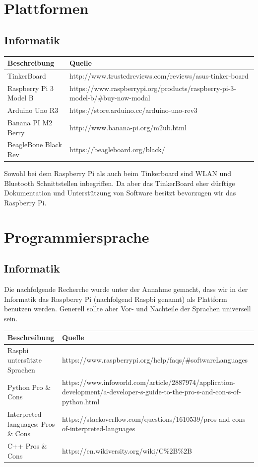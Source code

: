 \documentclass[a4paper]{report}
\begin{document}
\section{Plattformen}

\subsection{Informatik}
\vspace{1em}
\noindent
\begin{tabular}{|p{}|p{}|}
	\hline 
	\textbf{Beschreibung} & \textbf{Quelle} \\
	\hline
	TinkerBoard & http://www.trustedreviews.com/reviews/asus-tinker-board \\
	\hline
	Raspberry Pi 3 Model B & https://www.raspberrypi.org/products/raspberry-pi-3-model-b/\#buy-now-modal \\
	\hline
	Arduino Uno R3 & https://store.arduino.cc/arduino-uno-rev3\\
	\hline
	Banana PI M2 Berry & http://www.banana-pi.org/m2ub.html \\
	\hline
	BeagleBone Black Rev & https://beagleboard.org/black/\\
	\hline
\end{tabular}

\vspace{1em}
Sowohl bei dem Raspberry Pi als auch beim Tinkerboard sind WLAN und Bluetooth Schnittstellen inbegriffen. Da aber das TinkerBoard eher dürftige Dokumentation und Unterstützung von Software besitzt \parencite[Fazit]{Finnamore2017} bevorzugen wir das Raspberry Pi.

\section{Programmiersprache}


\subsection{Informatik}
Die nachfolgende Recherche wurde unter der Annahme gemacht, dass wir in der Informatik das Raspberry Pi (nachfolgend Raspbi genannt) als Plattform benutzen werden. Generell sollte aber Vor- und Nachteile der Sprachen universell sein.

\vspace{1em}
\noindent
\begin{tabular}{|p{}|p{}|}
	\hline 
	\textbf{Beschreibung} & \textbf{Quelle} \\
	\hline
	Raspbi untersützte Sprachen& https://www.raspberrypi.org/help/faqs/\#softwareLanguages \\
	\hline
	Python Pro \& Cons & https://www.infoworld.com/article/2887974/application-development/a-developer-s-guide-to-the-pro-s-and-con-s-of-python.html \\ 
	\hline
	Interpreted languages: Pros \& Cons & https://stackoverflow.com/questions/1610539/pros-and-cons-of-interpreted-languages\\
	\hline
	C++ Pros \& Cons & https://en.wikiversity.org/wiki/C\%2B\%2B\\
	\hline
\end{tabular}
\end{document}
